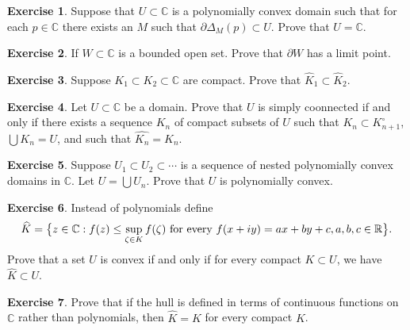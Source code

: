 \documentclass[12pt,openany]{book}
\newcommand{\avoidbreak}{\postdisplaypenalty=100}
\newcommand{\C}{{\mathbb{C}}}
\newcommand{\R}{{\mathbb{R}}}
\theoremstyle{plain}
\theoremstyle{remark}
\theoremstyle{definition}
\newenvironment{exbox}{%
    \def\FrameCommand{\vrule width 1pt \relax\hspace{10pt}}%
    \MakeFramed{\advance\hsize-\width\FrameRestore}%
}{%
    \endMakeFramed
}
\theoremstyle{exercise}
\newtheorem{exercise}{Exercise}[section]
\theoremstyle{example}
\begin{document}
\begin{exbox}
\begin{exercise}
Suppose that $U \subset \C$ is a polynomially convex domain such that for each
$p \in \C$ there exists an $M$ such that $\partial \Delta_M(p) \subset U$.
Prove that $U = \C$.
\end{exercise}

\begin{exercise}
If $W \subset \C$ is a bounded open set.  Prove that $\partial W$ has a
limit point.
\end{exercise}

\begin{exercise}
Suppose $K_1 \subset K_2 \subset \C$ are compact.  Prove that
$\widehat{K}_1 \subset \widehat{K}_2$.
\end{exercise}

\begin{exercise}
Let $U \subset \C$ be a domain.  Prove that $U$
is simply coonnected if and only if there exists a sequence $K_n$
of compact subsets of $U$ such that $K_n \subset K^\circ_{n+1}$,
$\bigcup K_n = U$, and such that $\widehat{K_n} = K_n$.
\end{exercise}

\begin{exercise}
Suppose $U_1 \subset U_2 \subset \cdots$ is a sequence
of nested polynomially convex domains in $\C$.  Let $U = \bigcup U_n$.
Prove that $U$ is polynomially convex.
\end{exercise}

\begin{exercise}
Instead of polynomials define
\begin{equation*}
\widehat{K} = \bigl\{ z \in \C : f(z) \leq \sup_{\zeta \in K}
f(\zeta) \text{ for every } f(x+iy) = ax+by + c, 
a,b,c \in \R
\bigr\}.
\avoidbreak
\end{equation*}
Prove that a set $U$ is convex if and only
if for every compact $K \subset U$, we have $\widehat{K} \subset U$.
\end{exercise}

\begin{exercise}
Prove that if the hull is defined in terms of continuous functions on $\C$
rather than polynomials, then $\widehat{K} = K$ for every compact $K$.
\end{exercise}
\end{exbox}

\end{document}
